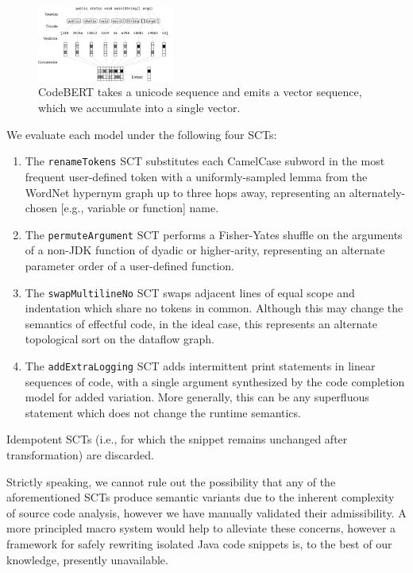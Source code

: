 \documentclass[sigconf,review,anonymous]{acmart}
\begin{document}
  \begin{figure}[H]
    \centering
    \includegraphics[width=0.40\textwidth]{figs/bert_embedding}
    \caption{CodeBERT takes a unicode sequence and emits a vector sequence, which we accumulate into a single vector.}
    \label{fig:bert}
  \end{figure}

  We evaluate each model under the following four SCTs:

  \begin{enumerate}
    \item The \lstinline|renameTokens| SCT substitutes each CamelCase subword in the most frequent user-defined token with a uniformly-sampled lemma from the WordNet hypernym graph up to three hops away, representing an alternately-chosen [e.g., variable or function] name.
    \item The \lstinline|permuteArgument| SCT performs a Fisher-Yates shuffle on the arguments of a non-JDK function of dyadic or higher-arity, representing an alternate parameter order of a user-defined function.
    \item The \lstinline|swapMultilineNo| SCT swaps adjacent lines of equal scope and indentation which share no tokens in common. Although this may change the semantics of effectful code, in the ideal case, this represents an alternate topological sort on the dataflow graph.
    \item The \lstinline|addExtraLogging| SCT adds intermittent print statements in linear sequences of code, with a single argument synthesized by the code completion model for added variation. More generally, this can be any superfluous statement which does not change the runtime semantics.
  \end{enumerate}

  Idempotent SCTs (i.e., for which the snippet remains unchanged after transformation) are discarded.

  Strictly speaking, we cannot rule out the possibility that any of the aforementioned SCTs produce semantic variants due to the inherent complexity of source code analysis, however we have manually validated their admissibility. A more principled macro system would help to alleviate these concerns, however a framework for safely rewriting isolated Java code snippets is, to the best of our knowledge, presently unavailable.
\end{document}
